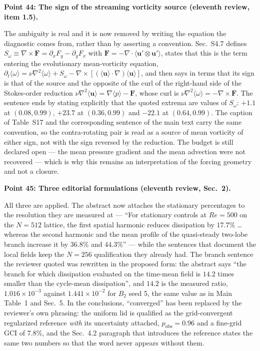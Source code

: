 \documentclass[11pt,a4paper]{article}
\begin{document}
\vspace{1em}

\noindent\textbf{Point 44: The sign of the streaming vorticity source (eleventh review,
item 1.5).}

The ambiguity is real and it is now removed by writing the equation the diagnostic comes
from, rather than by asserting a convention. Sec.~S4.7 defines
\(S_\omega\equiv\nabla\times\mathbf{F}=\partial_xF_y-\partial_yF_x\) with
\(\mathbf{F}=-\nabla\cdot\langle\mathbf{u}'\otimes\mathbf{u}'\rangle\), states that this
is the term entering the evolutionary mean-vorticity equation,
\(\partial_t\langle\omega\rangle=\nu\nabla^{2}\langle\omega\rangle+S_\omega-\nabla\times
[(\langle\mathbf{u}\rangle\cdot\nabla)\langle\mathbf{u}\rangle]\), and then says in terms
that its sign is that of the source and the opposite of the curl of the right-hand side of
the Stokes-order reduction \(\nu\nabla^{2}\langle\mathbf{u}\rangle=\nabla\langle p\rangle-
\mathbf{F}\), whose curl is \(\nu\nabla^{2}\langle\omega\rangle=-\nabla\times\mathbf{F}\).
The sentence ends by stating explicitly that the quoted extrema are values of
\(S_\omega\): \(+1.1\) at \((0.08,0.99)\), \(+23.7\) at \((0.36,0.99)\) and \(-22.1\) at
\((0.64,0.99)\). The caption of Table~S17 and the corresponding sentence of the main text
carry the same convention, so the contra-rotating pair is read as a source of mean
vorticity of either sign, not with the sign reversed by the reduction. The budget is still
declared open --- the mean pressure gradient and the mean advection were not recovered ---
which is why this remains an interpretation of the forcing geometry and not a closure.

\vspace{1em}

\noindent\textbf{Point 45: Three editorial formulations (eleventh review, Sec.~2).}

All three are applied. The abstract now attaches the stationary percentages to the
resolution they are measured at --- ``For stationary controls at \(Re=500\) on the
\(N=512\) lattice, the first spatial harmonic reduces dissipation by \(17.7\%\) \ldots
whereas the second harmonic and the mean profile of the quasi-steady two-lobe branch
increase it by \(36.8\%\) and \(44.3\%\)'' --- while the sentences that document the local
fields keep the \(N=256\) qualification they already had. The branch sentence the
reviewer quoted was rewritten in the proposed form: the abstract says ``the branch for
which dissipation evaluated on the time-mean field is \(14.2\) times smaller than the
cycle-mean dissipation'', and \(14.2\) is the measured ratio, \(1.016\times10^{-3}\)
against \(1.441\times10^{-2}\) for \(B_2\) seed 5, the same value as in Main Table~1 and
Sec.~5. In the conclusions, ``converged'' has been replaced by the reviewer's own
phrasing: the uniform lid is qualified as the grid-convergent regularized reference
\emph{with} its uncertainty attached, \(p_{\mathrm{obs}}=0.96\) and a fine-grid GCI of
\(7.8\%\), and the Sec.~4.2 paragraph that introduces the reference states the same two
numbers so that the word never appears without them.
\end{document}
